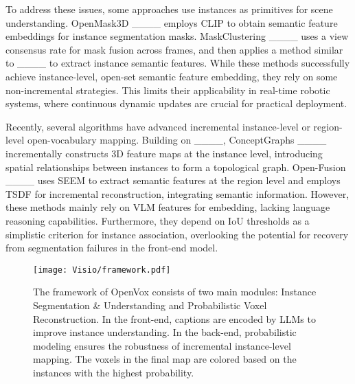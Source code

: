 To address these issues, some approaches use instances as primitives for scene understanding. OpenMask3D ____ employs CLIP to obtain semantic feature embeddings for instance segmentation masks. MaskClustering ____ uses a view consensus rate for mask fusion across frames, and then applies a method similar to ____ to extract instance semantic features.
While these methods successfully achieve instance-level, open-set semantic feature embedding, they rely on some non-incremental strategies. This limits their applicability in real-time robotic systems, where continuous dynamic updates are crucial for practical deployment.

Recently, several algorithms have advanced incremental instance-level or region-level open-vocabulary mapping. Building on ____, ConceptGraphs ____ incrementally constructs 3D feature maps at the instance level, introducing spatial relationships between instances to form a topological graph. Open-Fusion ____ uses SEEM to extract semantic features at the region level and employs TSDF for incremental reconstruction, integrating semantic information.
However, these methods mainly rely on VLM features for embedding, lacking language reasoning capabilities. Furthermore, they depend on IoU thresholds as a simplistic criterion for instance association, overlooking the potential for recovery from segmentation failures in the front-end model.






\begin{figure*}
    \centering
    \texttt{[image: Visio/framework.pdf]}
    \caption{The framework of OpenVox consists of two main modules: Instance Segmentation \& Understanding and Probabilistic Voxel Reconstruction. In the front-end, captions are encoded by LLMs to improve instance understanding. In the back-end, probabilistic modeling ensures the robustness of incremental instance-level mapping. The voxels in the final map are colored based on the instances with the highest probability.}
    \label{overview}
\end{figure*}